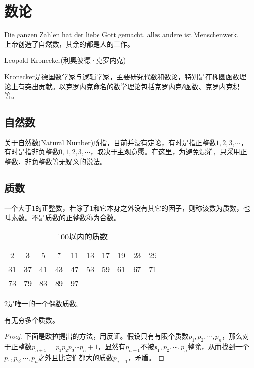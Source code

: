 
\chapter{数论}
\label{chap:number-theory}

\epigraph{Die ganzen Zahlen hat der liebe Gott gemacht, alles andere ist Menschenwerk.\\
  上帝创造了自然数，其余的都是人的工作。}{Leopold Kronecker(利奥波德·克罗内克)}

Kronecker是德国数学家与逻辑学家，主要研究代数和数论，特别是在椭圆函数理论上有突出贡献。以克罗内克命名的数学理论包括克罗内克$\delta$函数、克罗内克积等。

\section{自然数}
\label{sec:what-is-natural-number}

关于自然数(Natural Number)所指，目前并没有定论，有时是指正整数$1,2,3,\cdots$，有时是指非负整数$0,1,2,3,\cdots$，取决于主观意愿。在这里，为避免混淆，只采用正整数、非负整数等无疑义的说法。

\section{质数}
\label{sec:prime-number}

\begin{definition}
  一个大于$1$的正整数，若除了$1$和它本身之外没有其它的因子，则称该数为质数，也叫素数。不是质数的正整数称为合数。
\end{definition}

\begin{table}[htbp]
  \centering
  \begin{tabular}{cccccccccc}
    \hline
    2  & 3  & 5  & 7  & 11 & 13 & 17 & 19 & 23 & 29\\
    31 & 37 & 41 & 43 & 47 & 53 & 59 & 61 & 67 & 71\\
    73 & 79 & 83 & 89 & 97 &    &    &    &    &   \\
    \hline
  \end{tabular}
  \caption{100以内的质数}
  \label{tab:prime-numbers<100}
\end{table}

\begin{property}
  $2$是唯一的一个偶数质数。
\end{property}

\begin{theorem}
  有无穷多个质数。
\end{theorem}
\begin{proof}
  下面是欧拉提出的方法，用反证。假设只有有限个质数$p_1,p_2,\cdots,p_n$，那么对于正整数$p_{n+1}=p_1p_2p_3\cdots p_n + 1$，显然有$p_{n+1}$不被$p_1,p_2,\cdots,p_n$整除，从而找到一个$p_1,p_2,\cdots,p_n$之外且比它们都大的质数$p_{n+1}$，矛盾。
\end{proof}

